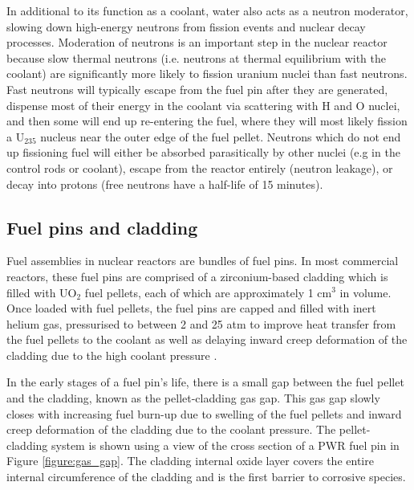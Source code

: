 In additional to its function as a coolant, water also acts as a neutron moderator, slowing down high-energy neutrons from fission events and nuclear decay processes. Moderation of neutrons is an important step in the nuclear reactor because slow thermal neutrons (i.e. neutrons at thermal equilibrium with the coolant) are significantly more likely to fission uranium nuclei than fast neutrons. Fast neutrons will typically escape from the fuel pin after they are generated, dispense most of their energy in the coolant via scattering with H and O nuclei, and then some will end up re-entering the fuel, where they will most likely fission a U$_{235}$ nucleus near the outer edge of the fuel pellet. Neutrons which do not end up fissioning fuel will either be absorbed parasitically by other nuclei (e.g in the control rods or coolant), escape from the reactor entirely (neutron leakage), or decay into protons (free neutrons have a half-life of 15 minutes).


\subsection{Fuel pins and cladding} \label{ss_fuelpin}

Fuel assemblies in nuclear reactors are bundles of fuel pins. In most commercial reactors, these fuel pins are comprised of a zirconium-based cladding which is filled with UO$_{2}$ fuel pellets, each of which are approximately 1 cm$^{3}$ in volume. Once loaded with fuel pellets, the fuel pins are capped and filled with inert helium gas, pressurised to between 2 and 25 atm to improve heat transfer from the fuel pellets to the coolant as well as delaying inward creep deformation of the cladding due to the high coolant pressure \cite{King1980}. 

In the early stages of a fuel pin's life, there is a small gap between the fuel pellet and the cladding, known as the pellet-cladding gas gap. This gas gap slowly closes with increasing fuel burn-up due to swelling of the fuel pellets and inward creep deformation of the cladding due to the coolant pressure. The pellet-cladding system is shown using a view of the cross section of a PWR fuel pin in Figure \ref{figure:gas_gap}. The cladding internal oxide layer covers the entire internal circumference of the cladding and is the first barrier to corrosive species. 

